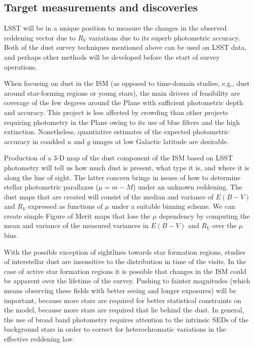 
\subsection{Target measurements and discoveries}
\label{sec:\secname:targets}

LSST will be in a unique position to measure the changes in the
observed reddening vector due to $R_V$ variations due to its superb
photometric accuracy.  Both of the dust survey techniques mentioned
above can be used on LSST data, and perhaps other methods will be
developed before the start of survey operations. 

 When focusing on dust in the ISM (as
opposed to time-domain studies, e.g., dust around star-forming
regions or young stars), the main drivers of feasibility are
coverage of the few degrees around the Plane with sufficient photometric depth
and accuracy. This project is less affected by crowding than other
projects requiring photometry in the Plane owing to its use of blue
filters and the high extinction.  Nonetheless, quantiative estimates of
the expected photometric accuracy in coadded $u$ and $g$ images at low
Galactic latitude are desirable.

Production of a 3-D map of the dust component of the ISM based on
  LSST photometry will tell us how much dust is present, what type it
  is, and where it is along the line of sight.  The latter concern
  brings in issues of how to determine stellar photometric parallaxes
  ($\mu = m-M$) under an unknown reddening. The dust maps that are
  created will consist of the median and variance of $E(B-V)$ and
  $R_V$ expressed as functions of $\mu$ under a suitable binning
  scheme. We can create simple Figure of Merit maps that lose the
  $\mu$ dependency by computing the mean and variance of the measured
  variances in $E(B-V)$ and $R_V$ over the $\mu$ bins.

With the possible exception of sightlines towards star formation
  regions, studies of interstellar dust are insensitive to the
  distribution in time of the visits. In the case of active star
  formation regions it is possible that changes in the ISM could be
  apparent over the lifetime of the survey. Pushing to fainter
  magnitudes (which means observing these fields with better seeing
  and longer exposures) will be important, because more stars are
  required for better statistical constraints on the model, because
  more stars are required that lie behind the dust. In general, the
  use of broad band photometry requires attention to the intrinsic
  SEDs of the background stars in order to correct for heterochromatic
  variations in the effective reddening law.

